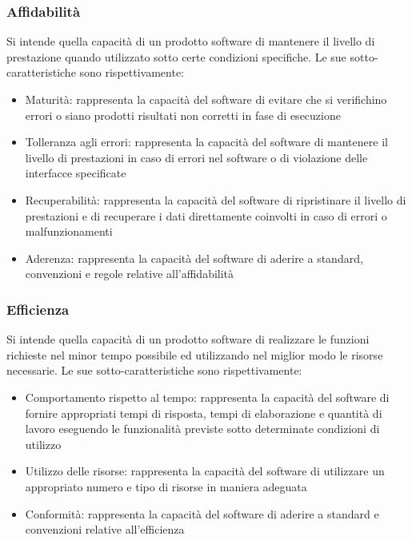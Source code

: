 \subsubsection{Affidabilità}
Si intende quella capacità di un prodotto software di mantenere il livello di prestazione quando utilizzato sotto certe condizioni specifiche.
Le sue sotto-caratteristiche sono rispettivamente:
\begin{itemize}
\item Maturità: rappresenta la capacità del software di evitare che si verifichino errori o siano prodotti risultati non corretti in fase di esecuzione 
\item Tolleranza agli errori: rappresenta la capacità del software  di mantenere il livello di prestazioni in caso di errori nel software o di violazione delle interfacce specificate
\item Recuperabilità: rappresenta la capacità del software di ripristinare il livello di prestazioni e di recuperare i dati direttamente coinvolti in caso di errori o malfunzionamenti
\item Aderenza: rappresenta la capacità del software di aderire a standard, convenzioni e regole relative all'affidabilità
\end{itemize}

\subsubsection{Efficienza}
Si intende quella capacità di un prodotto software di realizzare le funzioni richieste nel minor tempo possibile ed utilizzando nel miglior modo le risorse necessarie.
Le sue sotto-caratteristiche sono rispettivamente:
\begin{itemize}
\item Comportamento rispetto al tempo: rappresenta la capacità del software di fornire appropriati tempi di risposta, tempi di elaborazione e quantità di lavoro eseguendo le funzionalità previste sotto determinate condizioni di utilizzo
\item Utilizzo delle risorse: rappresenta la capacità del software di utilizzare un appropriato numero e tipo di risorse in maniera adeguata
\item Conformità: rappresenta la capacità del software di aderire a standard e convenzioni relative all'efficienza
\end{itemize}

